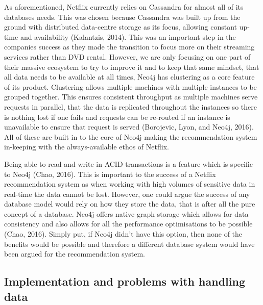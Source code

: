 \documentclass[a4paper]{article}
\begin{document}
As aforementioned, Netflix currently relies on Cassandra for almost all of its databases needs. This was chosen because Cassandra was built up from the ground with distributed data-centre storage as its focus, allowing constant up-time and availability (Kalantzis, 2014). This was an important step in the companies success as they made the transition to focus more on their streaming services rather than DVD rental. However, we are only focusing on one part of their massive ecosystem to try to improve it and to keep that same mindset, that all data needs to be available at all times, Neo4j has clustering as a core feature of its product. Clustering allows multiple machines with multiple instances to be grouped together. This ensures consistent throughput as multiple machines serve requests in parallel, that the data is replicated throughout the instances so there is nothing lost if one fails and requests can be re-routed if an instance is unavailable to ensure that request is served (Borojevic, Lyon, and Neo4j, 2016). All of these are built in to the core of Neo4j making the recommendation system in-keeping with the always-available ethos of Netflix. \par

Being able to read and write in ACID transactions is a feature which is specific to Neo4j (Chao, 2016). This is important to the success of a Netflix recommendation system as when working with high volumes of sensitive data in real-time the data cannot be lost. However, one could argue the success of any database model would rely on how they store the data, that is after all the pure concept of a database. Neo4j offers native graph storage which allows for data consistency and also allows for all the performance optimisations to be possible (Chao, 2016). Simply put, if Neo4j didn't have this option, then none of the benefits would be possible and therefore a different database system would have been argued for the recommendation system. \par

\subsection{Implementation and problems with handling data}
\end{document}
